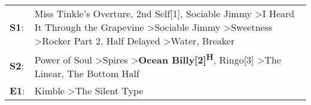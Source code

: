 \begin{supertabular}{p{0.03\textwidth}p{0.92\textwidth}}
 \textbf{S1}:  &  Miss Tinkle's Overture\textsuperscript{}, \enspace 2nd Self[1]\textsuperscript{}, \enspace Sociable Jimmy\textsuperscript{} \textgreater \enspace I Heard It Through the Grapevine\textsuperscript{} \textgreater \enspace Sociable Jimmy\textsuperscript{} \textgreater \enspace Sweetness\textsuperscript{} \textgreater \enspace Rocker Part 2\textsuperscript{}, \enspace Half Delayed\textsuperscript{} \textgreater \enspace Water\textsuperscript{}, \enspace Breaker\textsuperscript{}  \enspace  \\
 \textbf{S2}:  &                                                                                                                                                                                                             Power of Soul\textsuperscript{} \textgreater \enspace Spires\textsuperscript{} \textgreater \enspace \textbf{Ocean Billy[2]\textsuperscript{H}}, \enspace Ringo[3]\textsuperscript{} \textgreater \enspace The Linear\textsuperscript{}, \enspace The Bottom Half\textsuperscript{}  \enspace  \\
 \textbf{E1}:  &                                                                                                                                                                                                                                                                                                                                                                                                                Kimble\textsuperscript{} \textgreater \enspace The Silent Type\textsuperscript{}  \enspace  \\
\end{supertabular}

